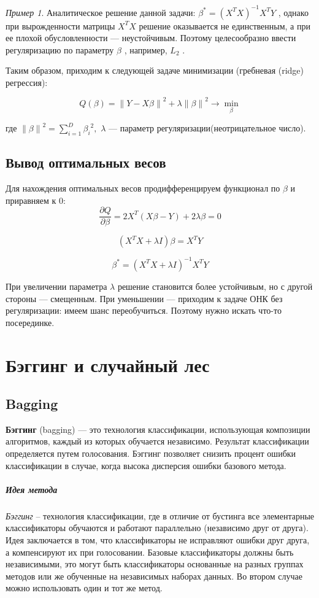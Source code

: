 \documentclass[a4paper, 12pt]{article}
\theoremstyle{plain} %
\theoremstyle{definition} %
\theoremstyle{remark} %
\newtheorem{example}{Пример}
\begin{document}
\begin{example}
Аналитическое решение данной задачи: $  \beta^{*} = (X^TX)^{-1}X^TY  $
, однако при вырожденности матрицы $  X^TX  $
 решение оказывается не единственным, а при ее плохой обусловленности — неустойчивым. Поэтому целесообразно ввести регуляризацию по параметру $  \beta  $
, например, $  L_2  $
.

Таким образом, приходим к следующей задаче минимизации (гребневая (ridge) регрессия):

\[
	Q(\beta)= \left \| Y - X\beta \right \|^2 + \lambda\left \|\beta \right \|^2 \longrightarrow \min_{\displaystyle \beta}
\]


где $ \left \|\beta \right \|^2 =\sum^{D}_{i=1} {\beta_i}^2,   $
 $  \lambda   $
 — параметр регуляризации(неотрицательное число).

\subsection{Вывод оптимальных весов}

Для нахождения оптимальных весов продифференцируем функционал по $ \beta  $
 и приравняем к 0:
 \[
 	\frac{\partial Q}{\partial \beta} = 2X^{T}(X\beta - Y) + 2\lambda\beta = 0
\]


\[
	(X^{T}X + \lambda I)\beta = X^{T}Y
\]


\[
	\beta^{*} =(X^{T}X + \lambda I)^{-1} X^{T}Y
\]

При увеличении параметра $  \lambda  $
 решение становится более устойчивым, но с другой стороны — смещенным. При уменьшении — приходим к задаче ОНК без регуляризации: имеем шанс переобучиться. Поэтому нужно искать что-то посерединке.

\section{Бэггинг и случайный лес}

\subsection{Bagging}

\textbf{Бэггинг} (bagging) --- это технология классификации, использующая композиции алгоритмов, каждый из которых обучается независимо. Результат классификации определяется путем голосования. Бэггинг позволяет снизить процент ошибки классификации в случае, когда высока дисперсия ошибки базового метода.

\subparagraph{Идея метода}

\emph{Бэггинг} – технология классификации, где в отличие от бустинга все элементарные классификаторы обучаются и работают параллельно (независимо друг от друга). Идея заключается в том, что классификаторы не исправляют ошибки друг друга, а компенсируют их при голосовании. Базовые классификаторы должны быть независимыми, это могут быть классификаторы основанные на разных группах методов или же обученные на независимых наборах данных. Во втором случае можно использовать один и тот же метод.


\end{example}
\end{document}

